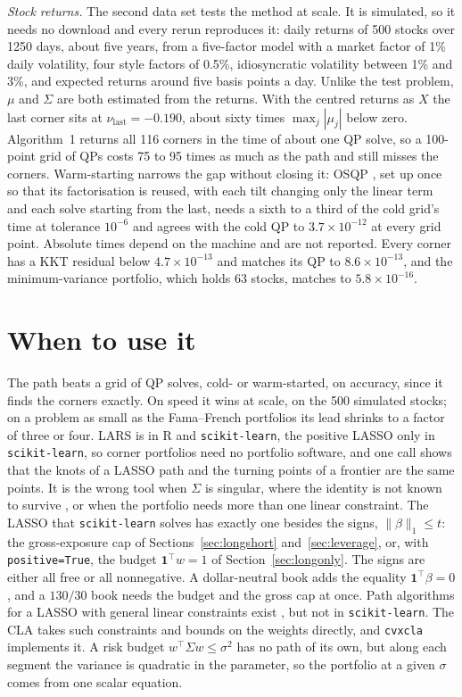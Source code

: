 \documentclass[11pt]{article}
\newcommand{\trans}{^{\top}}
\newcommand{\Sig}{\Sigma}
\begin{document}
\emph{Stock returns.} The second data set tests the method at scale. It is simulated, so
it needs no download and every rerun reproduces it: daily returns of 500 stocks over 1250
days, about five years, from a five-factor model with a market factor of 1\% daily
volatility, four style factors of 0.5\%, idiosyncratic volatility between 1\% and 3\%,
and expected returns around five basis points a day. Unlike the test problem, $\mu$ and
$\Sig$ are both estimated from the returns. With the centred returns as $X$ the last
corner sits at $\nu_{\mathrm{last}}=-0.190$, about sixty times $\max_j|\mu_j|$ below zero.
Algorithm~1 returns all 116 corners in the time of about one QP solve, so a 100-point
grid of QPs costs 75 to 95 times as much as the path and still misses the corners.
Warm-starting narrows the gap without closing it: OSQP \cite{stellato2020}, set up once so
that its factorisation is reused, with each tilt changing only the linear term and each
solve starting from the last, needs a sixth to a third of the cold grid's time at
tolerance $10^{-6}$ and agrees with the cold QP to $3.7\times10^{-12}$ at every grid point.
Absolute times depend on the machine and are not reported. Every corner has a KKT
residual below $4.7\times10^{-13}$ and matches its QP to $8.6\times10^{-13}$, and the
minimum-variance portfolio, which holds 63 stocks, matches to $5.8\times10^{-16}$.

\section{When to use it}
\label{sec:scope}

The path beats a grid of QP solves, cold- or warm-started, on accuracy, since it finds
the corners exactly. On speed it wins at scale, on the 500 simulated stocks; on a problem as
small as the Fama--French portfolios its lead shrinks to a factor of three or four. LARS is in R
and \texttt{scikit-learn}, the positive LASSO only in \texttt{scikit-learn}, so corner
portfolios need no portfolio software, and one call
shows that the knots of a LASSO path and the turning points of a frontier are the same
points. It is the wrong tool when $\Sig$ is singular,
where the identity is not known to survive \cite[\S7]{perspective}, or when the portfolio
needs more than one linear constraint. The LASSO that \texttt{scikit-learn} solves has
exactly one besides the signs, $\|\beta\|_1\le t$: the gross-exposure cap of
Sections~\ref{sec:longshort} and~\ref{sec:leverage}, or, with \texttt{positive=True},
the budget $\mathbf 1\trans w=1$ of Section~\ref{sec:longonly}. The signs are either all
free or all nonnegative. A dollar-neutral book adds the equality $\mathbf 1\trans\beta=0$,
and a $130/30$ book needs the budget and the gross cap at once. Path algorithms for a
LASSO with general linear constraints exist \cite{gaines2018,james2020}, but not in
\texttt{scikit-learn}. The CLA takes such constraints and bounds on the weights directly,
and \texttt{cvxcla} \cite{cvxcla} implements it. A risk budget $w\trans\Sig w\le\sigma^2$ has no path of its own, but
along each segment the variance is quadratic in the parameter, so the portfolio at a
given $\sigma$ comes from one scalar equation.
\end{document}
